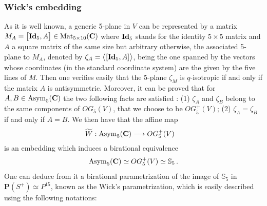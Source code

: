 \documentclass[11pt]{amsart}
\begin{document}
\subsubsection{\bf Wick's embedding} 
As it is well known, a generic 5-plane in $V$ can be represented by a  matrix $M_A=\big[ {\bf Id}_5,A\big]\in {\rm Mat}_{5\times 10}(\mathbf C)$ where ${\bf Id}_5$ stands for the identity $5\times 5$ matrix and $A$ a square matrix of the same size but arbitrary otherwise, the associated 5-plane to $M_A$, denoted by $\zeta_A=\big\langle [ {\bf Id}_5,A]\big\rangle$,  being the one spanned by the vectors 
whose coordinates (in the standard coordinate system) are the given by the five lines of $M$. Then one verifies easily that the 5-plane $\zeta_M$ is $q$-isotropic if and only if the matrix $A$ is antisymmetric.  Moreover, it can be proved that for $A,B\in {\rm Asym}_5(\mathbf C)$ the two following facts are satisfied : (1) $\zeta_A$ and $\zeta_B$ belong to the same components of $OG_5(V)$, that we choose to be $OG_5^+(V)$; (2) $\zeta_A=\zeta_B$ if and only if $A=B$. We then have that the affine map
\begin{align*}
\widetilde W : {\rm Asym}_5(\mathbf C) & \longrightarrow OG_5^+(V)
\end{align*}
is an embedding which induces a birational equivalence 
\begin{equation}
\label{Eq:Asym5-bir-S5}
 {\rm Asym}_5(\mathbf C) \simeq OG_5^+(V)\simeq \mathbb S_5\,.
 \end{equation}
  One can deduce from it a birational parametrization of the image of $\mathbb S_5$ in $\mathbf P(S^+)\simeq P^{15}$, known as the Wick's parametrization, which is easily described using the following notations: 
\end{document}
